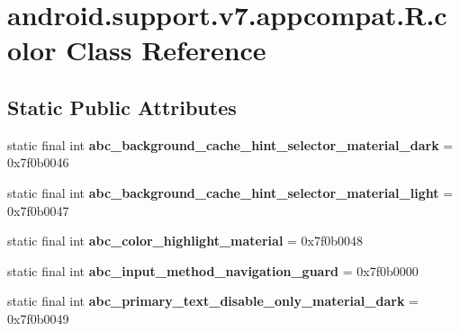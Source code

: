 \hypertarget{classandroid_1_1support_1_1v7_1_1appcompat_1_1_r_1_1color}{}\section{android.\+support.\+v7.\+appcompat.\+R.\+color Class Reference}
\label{classandroid_1_1support_1_1v7_1_1appcompat_1_1_r_1_1color}
\subsection*{Static Public Attributes}
\begin{DoxyCompactItemize}
\item 
\hypertarget{classandroid_1_1support_1_1v7_1_1appcompat_1_1_r_1_1color_a45abf46d211e98947a1719ec5c2e62e9}{}static final int {\bfseries abc\+\_\+background\+\_\+cache\+\_\+hint\+\_\+selector\+\_\+material\+\_\+dark} = 0x7f0b0046\label{classandroid_1_1support_1_1v7_1_1appcompat_1_1_r_1_1color_a45abf46d211e98947a1719ec5c2e62e9}

\item 
\hypertarget{classandroid_1_1support_1_1v7_1_1appcompat_1_1_r_1_1color_a7e19f3cbb99fc8d4205b7fafdb513fc8}{}static final int {\bfseries abc\+\_\+background\+\_\+cache\+\_\+hint\+\_\+selector\+\_\+material\+\_\+light} = 0x7f0b0047\label{classandroid_1_1support_1_1v7_1_1appcompat_1_1_r_1_1color_a7e19f3cbb99fc8d4205b7fafdb513fc8}

\item 
\hypertarget{classandroid_1_1support_1_1v7_1_1appcompat_1_1_r_1_1color_ac136ab6cd85c7e58fd679a2653eaa58a}{}static final int {\bfseries abc\+\_\+color\+\_\+highlight\+\_\+material} = 0x7f0b0048\label{classandroid_1_1support_1_1v7_1_1appcompat_1_1_r_1_1color_ac136ab6cd85c7e58fd679a2653eaa58a}

\item 
\hypertarget{classandroid_1_1support_1_1v7_1_1appcompat_1_1_r_1_1color_a2b65b695a4c6070b98956b74e00d5f37}{}static final int {\bfseries abc\+\_\+input\+\_\+method\+\_\+navigation\+\_\+guard} = 0x7f0b0000\label{classandroid_1_1support_1_1v7_1_1appcompat_1_1_r_1_1color_a2b65b695a4c6070b98956b74e00d5f37}

\item 
\hypertarget{classandroid_1_1support_1_1v7_1_1appcompat_1_1_r_1_1color_a3c6a75ea6dc09fc31b528990012db1b7}{}static final int {\bfseries abc\+\_\+primary\+\_\+text\+\_\+disable\+\_\+only\+\_\+material\+\_\+dark} = 0x7f0b0049\label{classandroid_1_1support_1_1v7_1_1appcompat_1_1_r_1_1color_a3c6a75ea6dc09fc31b528990012db1b7}


\end{DoxyCompactItemize}
